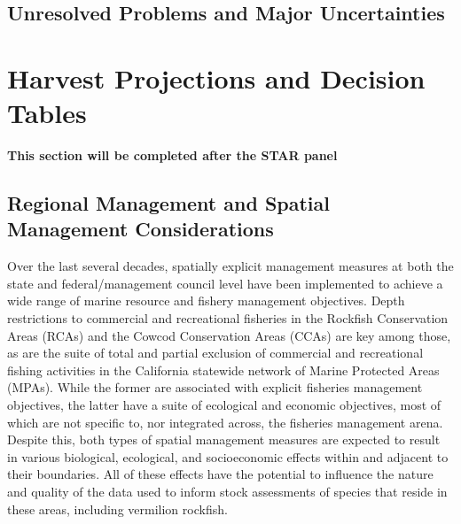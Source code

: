 \documentclass[
  english,
  a4paper,
]{article}
\begin{document}
\hypertarget{unresolved-problems-and-major-uncertainties-1}{%
\subsection{Unresolved Problems and Major Uncertainties}\label{unresolved-problems-and-major-uncertainties-1}}

\hypertarget{harvest-projections-and-decision-tables}{%
\section{Harvest Projections and Decision Tables}\label{harvest-projections-and-decision-tables}}

\textbf{This section will be completed after the STAR panel}

\hypertarget{regional-management-and-spatial-management-considerations}{%
\subsection{Regional Management and Spatial Management Considerations}\label{regional-management-and-spatial-management-considerations}}

Over the last several decades, spatially explicit management measures at both the state and federal/management council level have been implemented to achieve a wide range of marine resource and fishery management objectives. Depth restrictions to commercial and recreational fisheries in the Rockfish Conservation Areas (RCAs) and the Cowcod Conservation Areas (CCAs) are key among those, as are the suite of total and partial exclusion of commercial and recreational fishing activities in the California statewide network of Marine Protected Areas (MPAs). While the former are associated with explicit fisheries management objectives, the latter have a suite of ecological and economic objectives, most of which are not specific to, nor integrated across, the fisheries management arena. Despite this, both types of spatial management measures are expected to result in various biological, ecological, and socioeconomic effects within and adjacent to their boundaries. All of these effects have the potential to influence the nature and quality of the data used to inform stock assessments of species that reside in these areas, including vermilion rockfish.
\end{document}
